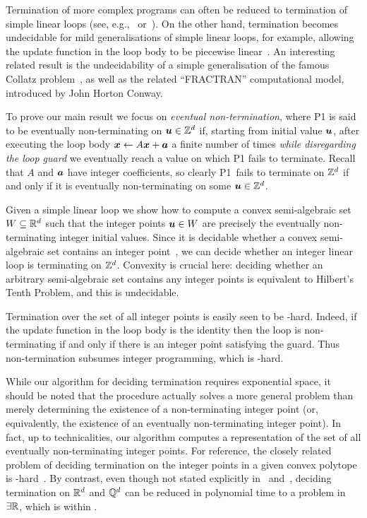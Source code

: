 Termination of more complex programs can often be reduced to
termination of simple linear loops (see, e.g.,~\cite{CookPR06}
or~\cite[Section 6]{Tiw04}).  On the other hand, termination becomes
undecidable for mild generalisations of simple linear loops, for
example, allowing the update function in the loop body to be piecewise
linear~\cite{BGM12}. An interesting related result is the undecidability
of a simple generalisation of the famous Collatz problem~\cite{GeneralisedCollatz},
as well as the related ``FRACTRAN'' computational model, introduced by John Horton Conway.

To prove our main result we focus on \emph{eventual non-termination},
where \textsf{P1} is said to be eventually non-terminating on
$\boldsymbol{u} \in \mathbb{Z}^{d}$ if, starting from initial value
$\boldsymbol{u}$, after executing the loop body $\boldsymbol{x} \gets
A\boldsymbol{x}+\boldsymbol{a}$ a finite number of times \emph{while
  disregarding the loop guard} we eventually reach a value on which
\textsf{P1} fails to terminate.  Recall that $A$ and $\boldsymbol{a}$
have integer coefficients, so clearly \textsf{P1}~fails to
terminate on $\mathbb{Z}^{d}$ if and only if it is eventually
non-terminating on some $\boldsymbol{u} \in \mathbb{Z}^{d}$.

Given a simple linear loop we show how to compute a convex
semi-algebraic set $W \subseteq \mathbb{R}^{d}$ such that the integer
points $\boldsymbol{u} \in W$ are precisely the eventually
non-terminating integer initial values.  Since it is decidable whether
a convex semi-algebraic set contains an integer
point~\cite{KhachiyanP97}, we can
decide whether an integer linear loop is terminating on
$\mathbb{Z}^{d}$. Convexity is crucial here: deciding whether an arbitrary
semi-algebraic set contains any integer points is equivalent to
Hilbert's Tenth Problem, and this is undecidable.

Termination over the set of all integer points is easily seen to be
\coNP-hard.  Indeed, if the update function in the loop body
is the identity then the loop is non-terminating if and only if there
is an integer point satisfying the guard.  Thus non-termination
subsumes integer programming, which is \NP-hard.

While our algorithm for deciding termination requires exponential
space, it should be noted that the procedure actually solves a more
general problem than merely determining the existence of a
non-terminating integer point (or, equivalently, the existence of an
eventually non-terminating integer point).  In fact, up to technicalities,
our algorithm computes a representation of the set of all eventually non-terminating
integer points.  For reference, the closely related problem of
deciding termination on the integer points in a given convex polytope is
\EXPSPACE{}-hard~\cite{BGM12}. By contrast, even though not stated explicitly in~\cite{Tiw04} and~\cite{Bra06},
deciding termination on $\mathbb{R}^{d}$ and $\mathbb{Q}^{d}$ can be reduced in polynomial time
to a problem in $\exists \mathbb{R}$, which is within \PSPACE{}.

